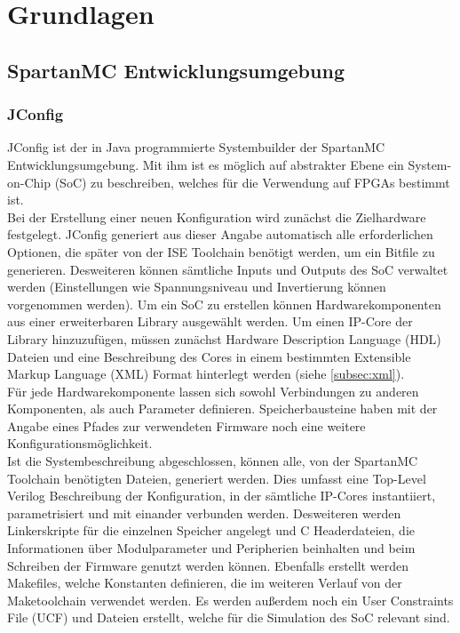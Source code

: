 \chapter{Grundlagen}
\section{SpartanMC Entwicklungsumgebung}
\subsection{JConfig}
JConfig ist der in Java programmierte Systembuilder der SpartanMC Entwicklungsumgebung. Mit ihm ist es möglich
auf abstrakter Ebene ein System-on-Chip (SoC) zu beschreiben, welches für die Verwendung auf FPGAs bestimmt ist. \\
Bei der Erstellung einer neuen Konfiguration wird zunächst die Zielhardware festgelegt. JConfig generiert aus dieser
Angabe automatisch alle erforderlichen Optionen, die später von der ISE Toolchain benötigt werden, um ein Bitfile
zu generieren. Desweiteren können sämtliche Inputs und Outputs des SoC verwaltet werden (Einstellungen wie Spannungsniveau 
und Invertierung können vorgenommen werden).
Um ein SoC zu erstellen können Hardwarekomponenten aus einer erweiterbaren Library ausgewählt werden. Um einen IP-Core der
Library hinzuzufügen, müssen zunächst Hardware Description Language (HDL) Dateien und eine Beschreibung des Cores in einem bestimmten Extensible Markup Language (XML) Format hinterlegt werden (siehe \ref{subsec:xml}).\\
Für jede Hardwarekomponente lassen sich sowohl Verbindungen zu anderen Komponenten, als auch Parameter definieren.
Speicherbausteine haben mit der Angabe eines Pfades zur verwendeten Firmware noch eine weitere Konfigurationsmöglichkeit.\\
Ist die Systembeschreibung abgeschlossen, können alle, von der SpartanMC Toolchain benötigten Dateien, generiert werden.
Dies umfasst eine Top-Level Verilog Beschreibung der Konfiguration, in der sämtliche IP-Cores instantiiert, parametrisiert und mit
einander verbunden werden. Desweiteren werden Linkerskripte für die einzelnen Speicher angelegt und C Headerdateien, die Informationen
über Modulparameter und Peripherien beinhalten und beim Schreiben der Firmware genutzt werden können. Ebenfalls erstellt werden
Makefiles, welche Konstanten definieren, die im weiteren Verlauf von der Maketoolchain verwendet werden. Es werden außerdem noch ein
User Constraints File (UCF) und Dateien erstellt, welche für die Simulation des SoC relevant sind.


